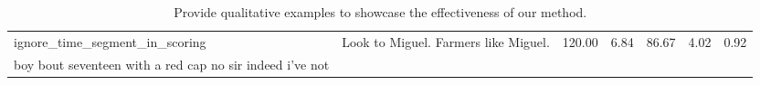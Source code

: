 \begin{table*}[ht!]
\begin{tabular}{p{5cm}p{5cm}p{1cm}p{1cm}p{1cm}p{1cm}p{1cm}}
ignore\_time\_segment\_in\_scoring                                                                                                                                                                                                                                                                 & Look to Miguel. Farmers like Miguel.                                                                                                                                                                                                                                                                 & 120.00   & 6.84  & 86.67  & 4.02  & 0.92       \\
boy bout seventeen with a red cap no sir indeed i've not  \\   \bottomrule           
\end{tabular}
\caption{
Provide qualitative examples to showcase the effectiveness of our method. 
}
\end{table*}